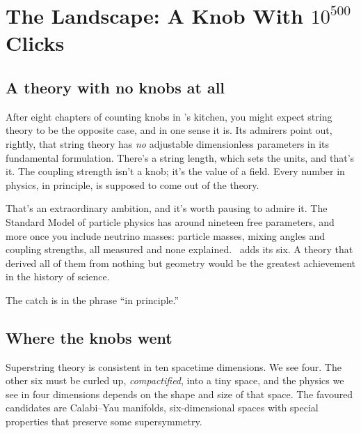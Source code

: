\chapter{The Landscape: A Knob With \texorpdfstring{$10^{500}$}{10\textasciicircum 500} Clicks}




\section{A theory with no knobs at all}

After eight chapters of counting knobs in \LCDM's kitchen, you might expect string theory to be the opposite case, and in one sense it is. Its admirers point out, rightly, that string theory has \emph{no} adjustable dimensionless parameters in its fundamental formulation. There's a string length, which sets the units, and that's it. The coupling strength isn't a knob; it's the value of a field. Every number in physics, in principle, is supposed to come out of the theory.

That's an extraordinary ambition, and it's worth pausing to admire it. The Standard Model of particle physics has around nineteen free parameters, and more once you include neutrino masses: particle masses, mixing angles and coupling strengths, all measured and none explained. \LCDM\ adds its six. A theory that derived all of them from nothing but geometry would be the greatest achievement in the history of science.

The catch is in the phrase ``in principle.''

\section{Where the knobs went}

Superstring theory is consistent in ten spacetime dimensions. We see four. The other six must be curled up, \emph{compactified}, into a tiny space, and the physics we see in four dimensions depends on the shape and size of that space. The favoured candidates are Calabi--Yau manifolds, six-dimensional spaces with special properties that preserve some supersymmetry.

